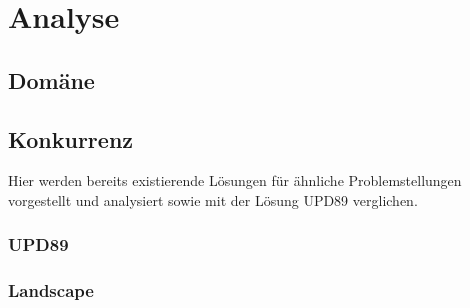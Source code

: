 \chapter{Analyse}

\section{Domäne}

\section{Konkurrenz} \label{sec:analysis:competition}

Hier werden bereits existierende Lösungen für ähnliche Problemstellungen vorgestellt und analysiert sowie mit der Lösung \gls{UPD89} verglichen.

\subsection{UPD89}

\newcommand{\competitor}[8]{
	\begin{tabularx}{\linewidth}{lX}
		\toprule
		\textbf{Produkt} & #1\\
		\midrule
		\textbf{Hersteller} & #2\\
		\textbf{Beschreibung} & #3\\
		\textbf{Features} & #4\\
    \textbf{Lizenz} & #5\\
		\textbf{Kosten} & #6\\
    \textbf{URL} & #7\\
    \textbf{Eignung} & #8\\
		\bottomrule
	\end{tabularx}
}

\subsection{Landscape}

